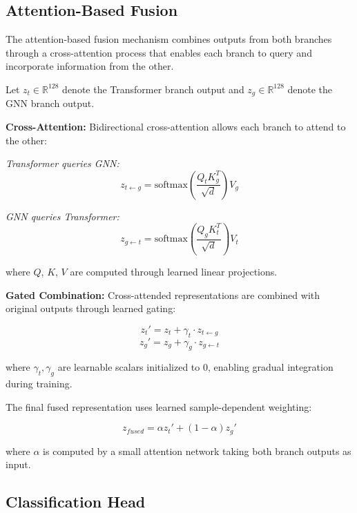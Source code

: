 \documentclass[blue,fullpaper]{ludusofficial}  %
\begin{document}
\subsection{Attention-Based Fusion}

The attention-based fusion mechanism combines outputs from both branches through a cross-attention process that enables each branch to query and incorporate information from the other.

Let $z_t \in \mathbb{R}^{128}$ denote the Transformer branch output and $z_g \in \mathbb{R}^{128}$ denote the GNN branch output.

\textbf{Cross-Attention:} Bidirectional cross-attention allows each branch to attend to the other:

\textit{Transformer queries GNN:}
\begin{equation}
z_{t \leftarrow g} = \text{softmax}\left(\frac{Q_t K_g^T}{\sqrt{d}}\right) V_g
\end{equation}

\textit{GNN queries Transformer:}
\begin{equation}
z_{g \leftarrow t} = \text{softmax}\left(\frac{Q_g K_t^T}{\sqrt{d}}\right) V_t
\end{equation}

where $Q$, $K$, $V$ are computed through learned linear projections.

\textbf{Gated Combination:} Cross-attended representations are combined with original outputs through learned gating:

\begin{equation}
z_t' = z_t + \gamma_t \cdot z_{t \leftarrow g}
\end{equation}
\begin{equation}
z_g' = z_g + \gamma_g \cdot z_{g \leftarrow t}
\end{equation}

where $\gamma_t, \gamma_g$ are learnable scalars initialized to 0, enabling gradual integration during training.

The final fused representation uses learned sample-dependent weighting:

\begin{equation}
z_{fused} = \alpha z_t' + (1-\alpha) z_g'
\end{equation}

where $\alpha$ is computed by a small attention network taking both branch outputs as input.

\subsection{Classification Head}
\end{document}
